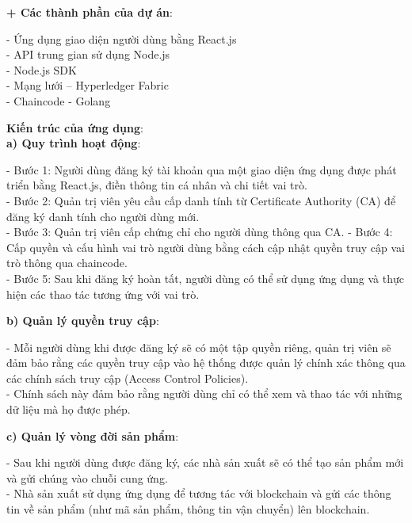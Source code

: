 \documentclass[a4paper,12pt]{article}
\begin{document}
\textbf{+ Các thành phần của dự án}:
\begin{itemize}
- Ứng dụng giao diện người dùng bằng React.js\\
- API trung gian sử dụng Node.js\\
- Node.js SDK\\
- Mạng lưới – Hyperledger Fabric\\
- Chaincode - Golang\\
\end{itemize}

\textbf{Kiến trúc của ứng dụng}:\\
\textbf{a) Quy trình hoạt động}:
\begin{itemize}
- Bước 1: Người dùng đăng ký tài khoản qua một giao diện ứng dụng được phát triển bằng React.js, điền thông tin cá nhân và chi tiết vai trò.\\
- Bước 2: Quản trị viên yêu cầu cấp danh tính từ Certificate Authority (CA) để đăng ký danh tính cho người dùng mới.\\
- Bước 3: Quản trị viên cấp chứng chỉ cho người dùng thông qua CA.
- Bước 4: Cấp quyền và cấu hình vai trò người dùng bằng cách cập nhật quyền truy cập vai trò thông qua chaincode.\\
- Bước 5: Sau khi đăng ký hoàn tất, người dùng có thể sử dụng ứng dụng và thực hiện các thao tác tương ứng với vai trò.\\
\end{itemize}

\textbf{b) Quản lý quyền truy cập}:
\begin{itemize}
- Mỗi người dùng khi được đăng ký sẽ có một tập quyền riêng, quản trị viên sẽ đảm bảo rằng các quyền truy cập vào hệ thống được quản lý chính xác thông qua các chính sách truy cập (Access Control Policies).\\
- Chính sách này đảm bảo rằng người dùng chỉ có thể xem và thao tác với những dữ liệu mà họ được phép.\\
\end{itemize}

\textbf{c) Quản lý vòng đời sản phẩm}:
\begin{itemize}
- Sau khi người dùng được đăng ký, các nhà sản xuất sẽ có thể tạo sản phẩm mới và gửi chúng vào chuỗi cung ứng.\\
- Nhà sản xuất sử dụng ứng dụng để tương tác với blockchain và gửi các thông tin về sản phẩm (như mã sản phẩm, thông tin vận chuyển) lên blockchain.\\
\end{itemize}
\end{document}

